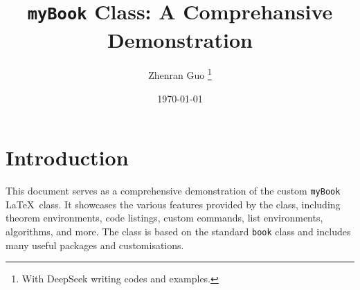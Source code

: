 \documentclass{myBook}
\title{\texttt{myBook} Class: A Comprehansive Demonstration}
\author{Zhenran Guo \thanks{With DeepSeek writing codes and examples.}}
\date{\today}
\begin{document}


\maketitle\pagebreak





\tableofcontents

\chapter{Introduction}
This document serves as a comprehensive demonstration of the custom \texttt{myBook} \LaTeX\ class. It showcases the various features provided by the class, including theorem environments, code listings, custom commands, list environments, algorithms, and more. The class is based on the standard \texttt{book} class and includes many useful packages and customisations.
\end{document}
